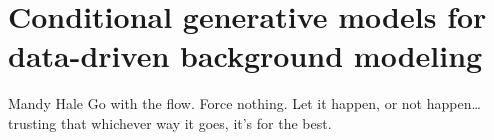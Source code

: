 \chapter{Conditional generative models for data-driven background modeling}
\begin{chapquote}{Mandy Hale}
{Go with the flow. Force nothing. Let it happen, or not happen\ldots trusting that whichever way it goes, it's for the best.}
\end{chapquote}


\def\baseTag{_deta_uo}


\def\subDir{chapters/flows-subsecs}












